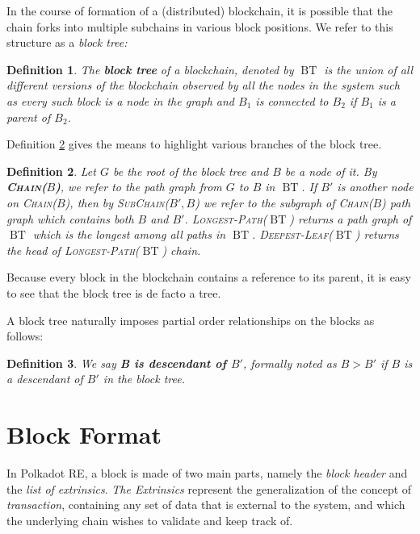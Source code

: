 \documentclass{article}
\newcommand{\tmem}[1]{{\em #1\/}}
\newcommand{\tmname}[1]{\textsc{#1}}
\newcommand{\tmop}[1]{\ensuremath{\operatorname{#1}}}
\newcommand{\tmstrong}[1]{\textbf{#1}}
\newcommand{\tmtextbf}[1]{{\bfseries{#1}}}
\newcommand{\tmtextit}[1]{{\itshape{#1}}}
\newcommand{\tmtextsc}[1]{{\scshape{#1}}}
\newtheorem{definition}{Definition}
\providecommand{\tmem}[1]{\tmtextit{#1}}
\providecommand{\tmname}[1]{\tmtextsc{#1}}
\providecommand{\tmop}[1]{\ensuremath{\mathrm{#1}}}
\providecommand{\tmstrong}[1]{\tmtextbf{#1}}
\providecommand{\tmtextbf}[1]{\tmtextbf{#1}}
\providecommand{\tmtextit}[1]{\tmtextit{#1}}
\newtheorem{definition}{Definition}
\begin{document}
In the course of formation of a (distributed) blockchain, it is possible that
the chain forks into multiple subchains in various block positions. We refer
to this structure as a {\tmem{block tree:}}

\begin{definition}
  \label{defn-block-tree}The {\tmstrong{block tree}} of a blockchain, denoted
  by $\tmop{BT}$ is the union of all different versions of the blockchain
  observed by all the nodes in the system such as every such block is a node
  in the graph and $B_1$ is connected to $B_2$ if $B_1$ is a parent of $B_2$.
\end{definition}

Definition \ref{defn-chain-subchain} gives the means to highlight various
branches of the block tree.

\begin{definition}
  \label{defn-chain-subchain}Let $G$ be the root of the block tree and $B$ be
  a node of it. By {\tmname{{\tmstrong{Chain($B$)}},}} we refer to the path
  graph from $G$ to $B$ in $\tmop{BT}$. If $B'$ is another node on
  {\tmname{Chain($B$)}}, then by {\tmname{SubChain($B', B$)}} we refer to the
  subgraph of {\tmname{Chain($B$)}} path graph which contains both $B$ and
  $B'$. {\tmname{Longest-Path($\tmop{BT}$)}} returns a path graph of
  $\tmop{BT}$ which is the longest among all paths in $\tmop{BT}$.
  {\tmname{Deepest-Leaf($\tmop{BT}$)}} returns the head of
  {\tmname{Longest-Path($\tmop{BT}$)}} chain.
\end{definition}

Because every block in the blockchain contains a reference to its parent, it
is easy to see that the block tree is de facto a tree.

A block tree naturally imposes partial order relationships on the blocks as
follows:

\begin{definition}
  We say {\tmstrong{B is descendant of $B'$}}, formally noted as {\tmstrong{$B
  > B'$}} if $B$ is a descendant of $B'$ in the block tree.
\end{definition}

\section{Block Format}

In Polkadot RE, a block is made of two main parts, namely the \tmtextit{block
header} and the \tmtextit{list of extrinsics}. {\tmem{The Extrinsics}}
represent the generalization of the concept of {\tmem{transaction}},
containing any set of data that is external to the system, and which the
underlying chain wishes to validate and keep track of.
\end{document}
